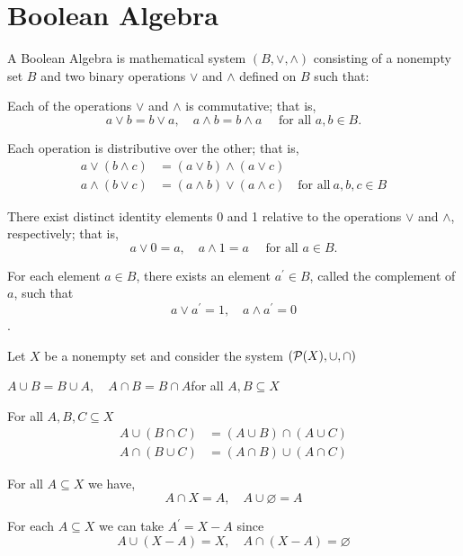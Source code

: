 \section{Boolean Algebra}

\begin{mydef}
A Boolean Algebra is mathematical system $(B,\vee,\wedge)$ consisting of a nonempty set $B$ and two binary operations $\vee$ and $\wedge$ defined on $B$ such that:
\begin{tasks}[label=$(\mathrm{P_{\arabic*}})$,label-width=22pt]
\task Each of the operations $\vee$ and $\wedge$ is commutative; that is,
$$
a \vee b=b \vee a, \quad a \wedge b=b \wedge a \quad \text { for all } a, b \in B .
$$

\task Each operation is distributive over the other; that is, 
\begin{align*}
    a\vee(b\wedge c)&=(a\vee b)\wedge (a\vee c)\\
    a\wedge(b\vee c)&=(a\wedge b)\vee(a\wedge c)\quad \text{for all}\ a,b,c\in B
\end{align*}

\task There exist distinct identity elements 0 and 1 relative to the operations $\vee$ and $\wedge$, respectively; that is,
$$
a \vee 0=a, \quad a \wedge 1=a \quad \text { for all } a \in B .
$$

\task For each element $a \in B$, there exists an element $a^{\prime} \in B$, called the complement of $a$, such that
$$
a \vee a^{\prime}=1, \quad a \wedge a^{\prime}=0 
$$.
\end{tasks}
\end{mydef}

\begin{example}
\label{ex1_2}
Let \(X\) be a nonempty set and consider the system \((\mathcal{P}(X),\cup,\cap)\)
\begin{tasks}[label=$(\mathrm{P_{\arabic*}})$,label-width=22pt]
    \task \(A\cup B=B\cup A,\quad A\cap B=B\cap A\)\quad for all \(A,B\subseteq X\)

    \task For all \(A,B,C\subseteq X\)
    \begin{align*}
        A\cup(B\cap C)&=(A\cup B)\cap(A\cup C)\\
        A\cap(B\cup C)&=(A\cap B)\cup(A\cap C)
    \end{align*}

    \task For all \(A\subseteq X\) we have,
    \[
    A\cap X=A,\quad A\cup\varnothing=A
    \]

    \task For each \(A\subseteq X\) we can take \(A^{\prime}=X-A\) since
    \[
    A\cup(X-A)=X,\quad A\cap(X-A)=\varnothing
    \]
\end{tasks}
\end{example}

